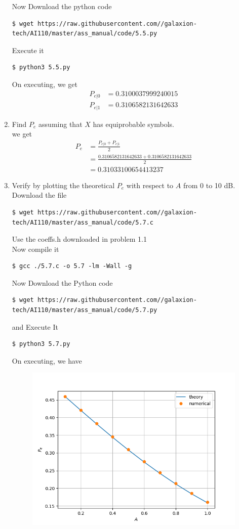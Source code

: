 \documentclass[journal,12pt,twocolumn]{IEEEtran}
\renewcommand\thesection{\arabic{section}}
\begin{document}
\begin{enumerate}[label=\thesection.\arabic*.,ref=\thesection.\theenumi]
Now Download the python code
\begin{lstlisting}
$ wget https://raw.githubusercontent.com//galaxion-tech/AI110/master/ass_manual/code/5.5.py
\end{lstlisting}
Execute it
\begin{lstlisting}
$ python3 5.5.py
\end{lstlisting}
On executing, we get
\begin{align}
    P_{e|0} &=0.3100037999240015 \\
    P_{e|1} &=0.3106582131642633
\end{align}
\item  Find $P_e$ assuming that $X$ has equiprobable symbols.\\
\solution we get
\begin{align}
    P_e &=\frac{P_{e|0}+P_{e|1}}{2} \\
    &=\frac{0.3106582131642633+0.3106582131642633}{2} \\ &= 0.31033100654413237
\end{align}
\item Verify by plotting the theoretical $P_e$ with respect to $A$ from 0 to 10 dB.\\
\solution Download the file
\begin{lstlisting}
$ wget https://raw.githubusercontent.com//galaxion-tech/AI110/master/ass_manual/code/5.7.c
\end{lstlisting} 
Use the coeffs.h downloaded in problem 1.1\\
Now compile it\\
\begin{lstlisting}
$ gcc ./5.7.c -o 5.7 -lm -Wall -g
\end{lstlisting}
Now Download the Python code
\begin{lstlisting}
$ wget https://raw.githubusercontent.com//galaxion-tech/AI110/master/ass_manual/code/5.7.py
\end{lstlisting}
and Execute It
\begin{lstlisting}
$ python3 5.7.py
\end{lstlisting}
On executing, we have
\begin{figure}[H]
    \includegraphics[scale=0.6]{./figs/5.7.png}

\end{figure}
\end{enumerate}
\end{document}
